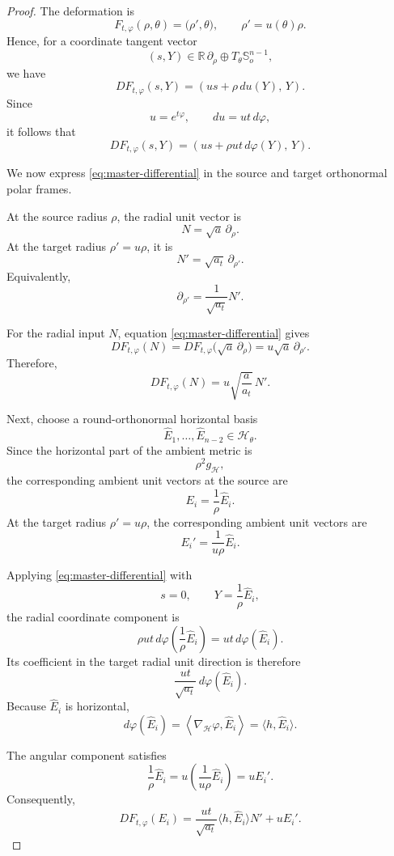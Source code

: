 \documentclass[10pt,a4paper]{amsart}
\begin{document}
\begin{proof}
The deformation is
\[
F_{t,\varphi}(\rho,\theta)
=
\bigl(\rho',\theta\bigr),
\qquad
\rho'=u(\theta)\rho.
\]
Hence, for a coordinate tangent vector
\[
(s,Y)
\in
\mathbb R\,\partial_\rho
\oplus
T_\theta\mathbb S_o^{n-1},
\]
we have
\[
DF_{t,\varphi}(s,Y)
=
\left(
us+\rho\,du(Y),\,Y
\right).
\]
Since
\[
u=e^{t\varphi},
\qquad
du=ut\,d\varphi,
\]
it follows that
\begin{equation}
DF_{t,\varphi}(s,Y)
=
\left(
us+\rho ut\,d\varphi(Y),\,Y
\right).
\label{eq:master-differential}
\end{equation}

We now express \eqref{eq:master-differential} in the source and
target orthonormal polar frames.

At the source radius $\rho$, the radial unit vector is
\[
N=\sqrt a\,\partial_\rho.
\]
At the target radius $\rho'=u\rho$, it is
\[
N'=\sqrt{a_t}\,\partial_{\rho'}.
\]
Equivalently,
\[
\partial_{\rho'}=\frac{1}{\sqrt{a_t}}N'.
\]

For the radial input $N$, equation
\eqref{eq:master-differential} gives
\[
DF_{t,\varphi}(N)
=
DF_{t,\varphi}\bigl(\sqrt a\,\partial_\rho\bigr)
=
u\sqrt a\,\partial_{\rho'}.
\]
Therefore,
\begin{equation}
DF_{t,\varphi}(N)
=
u\sqrt{\frac{a}{a_t}}\,N'.
\label{eq:DF-radial}
\end{equation}

Next, choose a round-orthonormal horizontal basis
\[
\widehat E_1,\ldots,\widehat E_{n-2}
\in\mathcal H_\theta.
\]
Since the horizontal part of the ambient metric is
\[
\rho^2 g_{\mathcal H},
\]
the corresponding ambient unit vectors at the source are
\[
E_i=\frac{1}{\rho}\widehat E_i.
\]
At the target radius $\rho'=u\rho$, the corresponding ambient unit
vectors are
\[
E_i'=\frac{1}{u\rho}\widehat E_i.
\]

Applying \eqref{eq:master-differential} with
\[
s=0,
\qquad
Y=\frac{1}{\rho}\widehat E_i,
\]
the radial coordinate component is
\[
\rho ut\,
d\varphi\left(\frac{1}{\rho}\widehat E_i\right)
=
ut\,d\varphi(\widehat E_i).
\]
Its coefficient in the target radial unit direction is therefore
\[
\frac{ut}{\sqrt{a_t}}\,
d\varphi(\widehat E_i).
\]
Because $\widehat E_i$ is horizontal,
\[
d\varphi(\widehat E_i)
=
\left\langle
\nabla_{\mathcal H}\varphi,\widehat E_i
\right\rangle
=
\langle h,\widehat E_i\rangle.
\]

The angular component satisfies
\[
\frac{1}{\rho}\widehat E_i
=
u\left(\frac{1}{u\rho}\widehat E_i\right)
=
uE_i'.
\]
Consequently,
\begin{equation}
DF_{t,\varphi}(E_i)
=
\frac{ut}{\sqrt{a_t}}
\langle h,\widehat E_i\rangle N'
+
uE_i'.
\label{eq:DF-horizontal}
\end{equation}


\end{proof}
\end{document}
